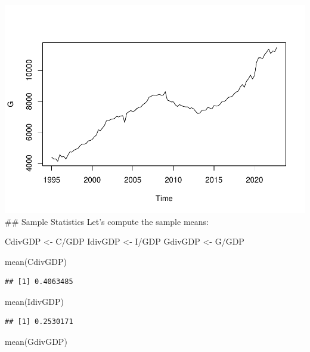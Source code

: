 \documentclass[
]{article}
\newenvironment{Shaded}{\begin{snugshade}}{\end{snugshade}}
\newcommand{\FunctionTok}[1]{\textcolor[rgb]{0.00,0.00,0.00}{#1}}
\newcommand{\NormalTok}[1]{#1}
\newcommand{\OtherTok}[1]{\textcolor[rgb]{0.56,0.35,0.01}{#1}}
\newcommand{\SpecialCharTok}[1]{\textcolor[rgb]{0.00,0.00,0.00}{#1}}
\begin{document}
\includegraphics{AdvMacro2_Assignment1_files/figure-latex/unnamed-chunk-2-4.pdf}
\#\# Sample Statistics Let's compute the sample means:

\begin{Shaded}
\begin{Highlighting}[]
\NormalTok{CdivGDP }\OtherTok{\textless{}{-}}\NormalTok{ C}\SpecialCharTok{/}\NormalTok{GDP}
\NormalTok{IdivGDP }\OtherTok{\textless{}{-}}\NormalTok{ I}\SpecialCharTok{/}\NormalTok{GDP}
\NormalTok{GdivGDP }\OtherTok{\textless{}{-}}\NormalTok{ G}\SpecialCharTok{/}\NormalTok{GDP}

\FunctionTok{mean}\NormalTok{(CdivGDP)}
\end{Highlighting}
\end{Shaded}

\begin{verbatim}
## [1] 0.4063485
\end{verbatim}

\begin{Shaded}
\begin{Highlighting}[]
\FunctionTok{mean}\NormalTok{(IdivGDP)}
\end{Highlighting}
\end{Shaded}

\begin{verbatim}
## [1] 0.2530171
\end{verbatim}

\begin{Shaded}
\begin{Highlighting}[]
\FunctionTok{mean}\NormalTok{(GdivGDP)}
\end{Highlighting}
\end{Shaded}
\end{document}
